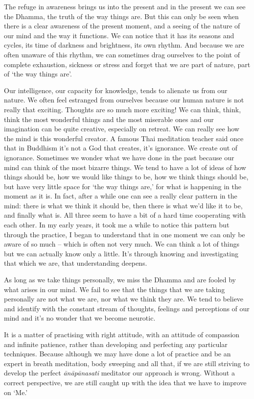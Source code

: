 The refuge in awareness brings us into the present and in the present we can see the Dhamma, the truth of the way things are. But this can only be seen when there is a clear awareness of the present moment, and a seeing of the nature of our mind and the way it functions. We can notice that it has its seasons and cycles, its time of darkness and brightness, its own rhythm. And because we are often unaware of this rhythm, we can sometimes drag ourselves to the point of complete exhaustion, sickness or stress and forget that we are part of nature, part of `the way things are'.

Our intelligence, our capacity for knowledge, tends to alienate us from our nature. We often feel estranged from \mbox{ourselves} because our human nature is not really that exciting. Thoughts are so much more exciting! We can think, think, think the most wonderful things and the most miserable ones and our imagination can be quite creative, especially on retreat. We can really see how the mind is this wonderful creator. A famous Thai meditation teacher said once that in Buddhism it's not a God that creates, it's ignorance. We create out of ignorance. Sometimes we wonder what we have done in the past because our mind can think of the most bizarre things. We tend to have a lot of ideas of how things should be, how we would like things to be, how we think things should be, but have very little space for `the way things are,' for what is happening in the moment as it is. In fact, after a while one can see a really clear pattern in the mind: there is what we think it should be, then there is what we'd like it to be, and finally what is. All three seem to have a bit of a hard time cooperating with each other. In my early years, it took me a while to notice this pattern but through the practice, I began to understand that in one moment we can only be aware of so much -- which is often not very much. We can think a lot of things but we can actually know only a little. It's through knowing and investigating that which we are, that understanding deepens.

As long as we take things personally, we miss the Dhamma and are fooled by what arises in our mind. We fail to see that the things that we are taking personally are not what we are, nor what we think they are. We tend to believe and identify with the constant stream of thoughts, feelings and perceptions of our mind and it's no wonder that we become neurotic.

It is a matter of practising with right attitude, with an attitude of compassion and infinite patience, rather than developing and perfecting any particular techniques. Because although we may have done a lot of practice and be an expert in breath meditation, body sweeping and all that, if we are still striving to develop the perfect \textit{\=an\=ap\=anasati} meditator our approach is wrong. Without a correct perspective, we are still caught up with the idea that we have to improve on `Me.'

